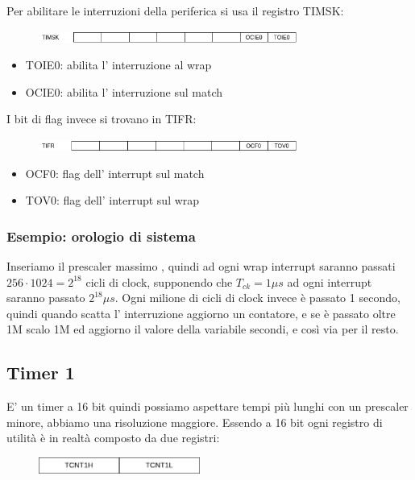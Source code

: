 Per abilitare le interruzioni della periferica si usa il registro TIMSK:
\begin{figure}[H]
    \centering
    \includegraphics[width=320px]{images/18_Timer/TIMSK.png}
\end{figure}
\begin{itemize}
    \item TOIE0: abilita l' interruzione al wrap
    \item OCIE0: abilita l' interruzione sul match
\end{itemize}
I bit di flag invece si trovano in TIFR:
\begin{figure}[H]
    \centering
    \includegraphics[width=320px]{images/18_Timer/TIFR.png}
\end{figure}
\begin{itemize}
    \item OCF0: flag dell' interrupt sul match
    \item TOV0: flag dell' interrupt sul wrap
\end{itemize}

\subsubsection{Esempio: orologio di sistema}
Inseriamo il prescaler massimo , quindi ad ogni wrap interrupt saranno passati $256 \cdot 1024 = 2^{18}$ cicli di clock, supponendo che $T_{ck} = 1\mu s$ ad ogni interrupt saranno passato $2^{18}\mu s$.
Ogni milione di cicli di clock invece è passato 1 secondo, quindi quando scatta l' interruzione aggiorno un contatore, e se è passato oltre 1M scalo 1M ed aggiorno il valore della variabile secondi, e così via per il resto. 


\subsection{Timer 1}
E' un timer a 16 bit quindi possiamo aspettare tempi più lunghi con un prescaler minore, abbiamo una risoluzione maggiore.
Essendo a 16 bit ogni registro di utilità è in realtà composto da due registri:
\begin{figure}[H]
    \centering
    \includegraphics[width=200px]{images/18_Timer/TCNT1.png}
\end{figure}

